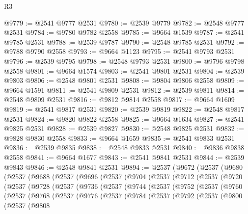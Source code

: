 \begin{lexlean}{R3}
\begin{coremodule}
@9779 := @2541 @9777 @2531
@9780 := @2539 @9779
@9782 := @2548 @9777 @2531
@9784 := @9780 @9782 @2558
@9785 := @9664 @1539
@9787 := @2541 @9785 @2531
@9788 := @2539 @9787
@9790 := @2548 @9785 @2531
@9792 := @9788 @9790 @2558
@9793 := @9664 @1123
@9795 := @2541 @9793 @2531
@9796 := @2539 @9795
@9798 := @2548 @9793 @2531
@9800 := @9796 @9798 @2558
@9801 := @9664 @1574
@9803 := @2541 @9801 @2531
@9804 := @2539 @9803
@9806 := @2548 @9801 @2531
@9808 := @9804 @9806 @2558
@9809 := @9664 @1591
@9811 := @2541 @9809 @2531
@9812 := @2539 @9811
@9814 := @2548 @9809 @2531
@9816 := @9812 @9814 @2558
@9817 := @9664 @1609
@9819 := @2541 @9817 @2531
@9820 := @2539 @9819
@9822 := @2548 @9817 @2531
@9824 := @9820 @9822 @2558
@9825 := @9664 @1634
@9827 := @2541 @9825 @2531
@9828 := @2539 @9827
@9830 := @2548 @9825 @2531
@9832 := @9828 @9830 @2558
@9833 := @9664 @1659
@9835 := @2541 @9833 @2531
@9836 := @2539 @9835
@9838 := @2548 @9833 @2531
@9840 := @9836 @9838 @2558
@9841 := @9664 @1677
@9843 := @2541 @9841 @2531
@9844 := @2539 @9843
@9846 := @2548 @9841 @2531
@9894 := @2537
    (@9672
      (@2537
        (@9680
          (@2537
            (@9688
              (@2537
                (@9696
                  (@2537
                    (@9704
                      (@2537
                        (@9712
                          (@2537
                            (@9720
                              (@2537
                                (@9728
                                  (@2537
                                    (@9736
                                      (@2537
                                        (@9744
                                          (@2537
                                            (@9752
                                              (@2537
                                                (@9760
                                                  (@2537
                                                    (@9768
                                                      (@2537
                                                        (@9776
                                                          (@2537
                                                            (@9784
                                                              (@2537
                                                                (@9792
                                                                  (@2537
                                                                    (@9800
                                                                      (@2537
                                                                        (@9808

\end{coremodule}
\end{lexlean}
